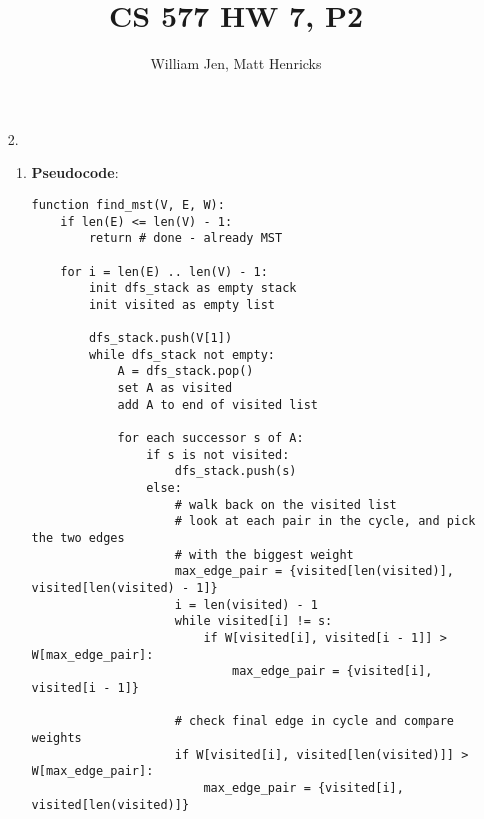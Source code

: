 \documentclass{article}
\title{CS 577 HW 7, P2}
\author{William Jen, Matt Henricks}
\date{}
\begin{document}
\maketitle


\begin{enumerate}
    \item[2.]
        \begin{enumerate}
            \item \textbf{Pseudocode}:
        
                \begin{verbatim}
function find_mst(V, E, W):
    if len(E) <= len(V) - 1:
        return # done - already MST 
    
    for i = len(E) .. len(V) - 1:
        init dfs_stack as empty stack
        init visited as empty list
        
        dfs_stack.push(V[1])
        while dfs_stack not empty:
            A = dfs_stack.pop()
            set A as visited
            add A to end of visited list
            
            for each successor s of A:
                if s is not visited:
                    dfs_stack.push(s)
                else:
                    # walk back on the visited list 
                    # look at each pair in the cycle, and pick the two edges
                    # with the biggest weight
                    max_edge_pair = {visited[len(visited)], visited[len(visited) - 1]}
                    i = len(visited) - 1
                    while visited[i] != s:
                        if W[visited[i], visited[i - 1]] > W[max_edge_pair]:
                            max_edge_pair = {visited[i], visited[i - 1]}
                    
                    # check final edge in cycle and compare weights
                    if W[visited[i], visited[len(visited)]] > W[max_edge_pair]:
                        max_edge_pair = {visited[i], visited[len(visited)]}
                    

\end{verbatim}
\end{enumerate}
\end{enumerate}
\end{document}
